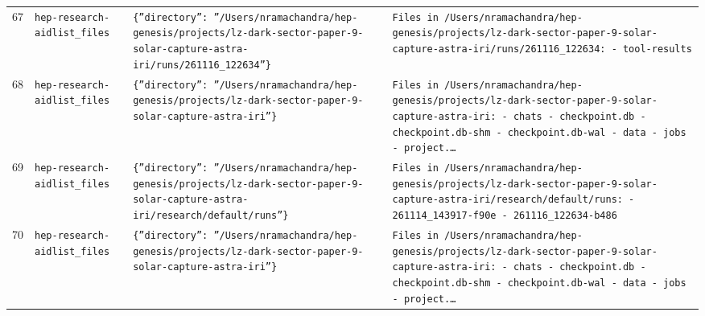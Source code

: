 \documentclass[11pt,a4paper]{article}
\begin{document}
\begin{longtable}{@{}p{}p{}p{}p{}@{}}
67 & \texttt{hep-research-aid}\newline\texttt{list\_\allowbreak{}files} & \texttt{\{''directory'':\allowbreak{} ''/\allowbreak{}Users/\allowbreak{}nramachandra/\allowbreak{}hep-genesis/\allowbreak{}projects/\allowbreak{}lz-dark-sector-paper-9-solar-capture-astra-iri/\allowbreak{}runs/\allowbreak{}261116\_\allowbreak{}122634''\}\allowbreak{}} & \texttt{Files in /\allowbreak{}Users/\allowbreak{}nramachandra/\allowbreak{}hep-genesis/\allowbreak{}projects/\allowbreak{}lz-dark-sector-paper-9-solar-capture-astra-iri/\allowbreak{}runs/\allowbreak{}261116\_\allowbreak{}122634:\allowbreak{}   - tool-results} \\
68 & \texttt{hep-research-aid}\newline\texttt{list\_\allowbreak{}files} & \texttt{\{''directory'':\allowbreak{} ''/\allowbreak{}Users/\allowbreak{}nramachandra/\allowbreak{}hep-genesis/\allowbreak{}projects/\allowbreak{}lz-dark-sector-paper-9-solar-capture-astra-iri''\}\allowbreak{}} & \texttt{Files in /\allowbreak{}Users/\allowbreak{}nramachandra/\allowbreak{}hep-genesis/\allowbreak{}projects/\allowbreak{}lz-dark-sector-paper-9-solar-capture-astra-iri:\allowbreak{}   - chats   - checkpoint.db   - checkpoint.db-shm   - checkpoint.db-wal   - data   - jobs   - project.\ldots{}\allowbreak{}} \\
69 & \texttt{hep-research-aid}\newline\texttt{list\_\allowbreak{}files} & \texttt{\{''directory'':\allowbreak{} ''/\allowbreak{}Users/\allowbreak{}nramachandra/\allowbreak{}hep-genesis/\allowbreak{}projects/\allowbreak{}lz-dark-sector-paper-9-solar-capture-astra-iri/\allowbreak{}research/\allowbreak{}default/\allowbreak{}runs''\}\allowbreak{}} & \texttt{Files in /\allowbreak{}Users/\allowbreak{}nramachandra/\allowbreak{}hep-genesis/\allowbreak{}projects/\allowbreak{}lz-dark-sector-paper-9-solar-capture-astra-iri/\allowbreak{}research/\allowbreak{}default/\allowbreak{}runs:\allowbreak{}   - 261114\_\allowbreak{}143917-f90e   - 261116\_\allowbreak{}122634-b486} \\
70 & \texttt{hep-research-aid}\newline\texttt{list\_\allowbreak{}files} & \texttt{\{''directory'':\allowbreak{} ''/\allowbreak{}Users/\allowbreak{}nramachandra/\allowbreak{}hep-genesis/\allowbreak{}projects/\allowbreak{}lz-dark-sector-paper-9-solar-capture-astra-iri''\}\allowbreak{}} & \texttt{Files in /\allowbreak{}Users/\allowbreak{}nramachandra/\allowbreak{}hep-genesis/\allowbreak{}projects/\allowbreak{}lz-dark-sector-paper-9-solar-capture-astra-iri:\allowbreak{}   - chats   - checkpoint.db   - checkpoint.db-shm   - checkpoint.db-wal   - data   - jobs   - project.\ldots{}\allowbreak{}} \\

\end{longtable}
\end{document}

